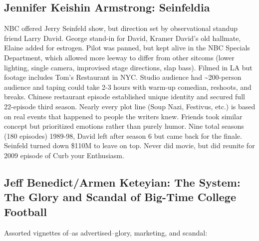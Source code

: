 \documentclass[
]{article}
\begin{document}
\hypertarget{jennifer-keishin-armstrong-seinfeldia}{%
\subsection{Jennifer Keishin Armstrong:
Seinfeldia}\label{jennifer-keishin-armstrong-seinfeldia}}

NBC offered Jerry Seinfeld show, but direction set by observational
standup friend Larry David. George stand-in for David, Kramer David's
old hallmate, Elaine added for estrogen. Pilot was panned, but kept
alive in the NBC Specials Department, which allowed more leeway to
differ from other sitcoms (lower lighting, single camera, improvised
stage directions, slap bass). Filmed in LA but footage includes Tom's
Restaurant in NYC. Studio audience had \textasciitilde200-person
audience and taping could take 2-3 hours with warm-up comedian,
reshoots, and breaks. Chinese restaurant episode established unique
identity and secured full 22-episode third season. Nearly every plot
line (Soup Nazi, Festivus, etc.) is based on real events that happened
to people the writers knew. Friends took similar concept but prioritized
emotions rather than purely humor. Nine total seasons (180 episodes)
1989-98, David left after season 6 but came back for the finale.
Seinfeld turned down \$110M to leave on top. Never did movie, but did
reunite for 2009 episode of Curb your Enthusiasm.

\hypertarget{jeff-benedictarmen-keteyian-the-system-the-glory-and-scandal-of-big-time-college-football}{%
\subsection{Jeff Benedict/Armen Keteyian: The System: The Glory and
Scandal of Big-Time College
Football}\label{jeff-benedictarmen-keteyian-the-system-the-glory-and-scandal-of-big-time-college-football}}

Assorted vignettes of--as advertised--glory, marketing, and scandal:
\end{document}
